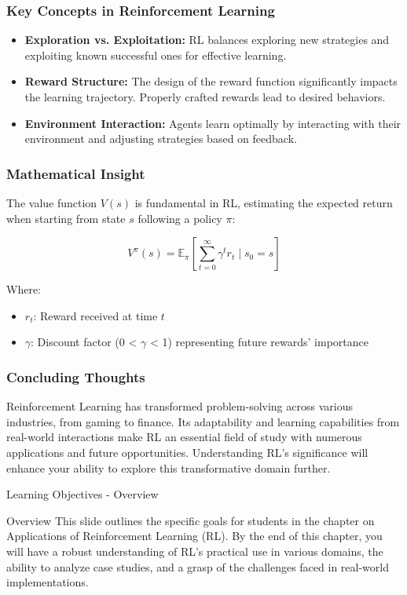 \documentclass[aspectratio=169]{beamer}
\begin{document}
\begin{frame}[fragile]
    \frametitle{Key Concepts in Reinforcement Learning}
    \begin{itemize}
        \item \textbf{Exploration vs. Exploitation:} RL balances exploring new strategies and exploiting known successful ones for effective learning.
        \item \textbf{Reward Structure:} The design of the reward function significantly impacts the learning trajectory. Properly crafted rewards lead to desired behaviors.
        \item \textbf{Environment Interaction:} Agents learn optimally by interacting with their environment and adjusting strategies based on feedback.
    \end{itemize}
\end{frame}

\begin{frame}[fragile]
    \frametitle{Mathematical Insight}
    The value function \( V(s) \) is fundamental in RL, estimating the expected return when starting from state \( s \) following a policy \( \pi \):

    \begin{equation}
        V^{\pi}(s) = \mathbb{E}_{\pi}\left[ \sum_{t=0}^{\infty} \gamma^t r_t \mid s_0 = s \right]
    \end{equation}

    Where:
    \begin{itemize}
        \item \( r_t \): Reward received at time \( t \)
        \item \( \gamma \): Discount factor (0 < \( \gamma \) < 1) representing future rewards' importance
    \end{itemize}
\end{frame}

\begin{frame}[fragile]
    \frametitle{Concluding Thoughts}
    Reinforcement Learning has transformed problem-solving across various industries, from gaming to finance. Its adaptability and learning capabilities from real-world interactions make RL an essential field of study with numerous applications and future opportunities. Understanding RL's significance will enhance your ability to explore this transformative domain further.
\end{frame}

\begin{frame}[fragile]{Learning Objectives - Overview}
  \begin{block}{Overview}
    This slide outlines the specific goals for students in the chapter on Applications of Reinforcement Learning (RL). By the end of this chapter, you will have a robust understanding of RL's practical use in various domains, the ability to analyze case studies, and a grasp of the challenges faced in real-world implementations.
  \end{block}
\end{frame}
\end{document}
